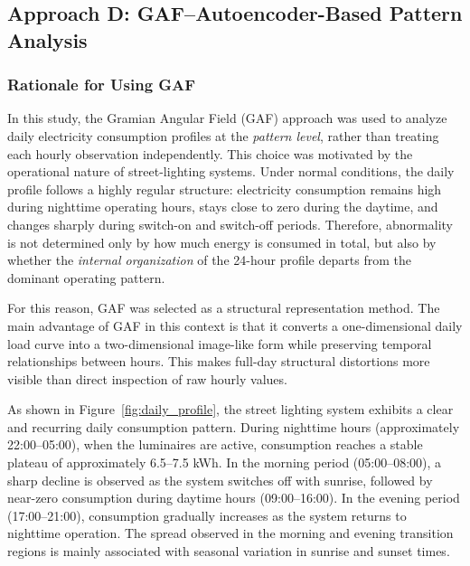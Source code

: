 \documentclass{article}
\begin{document}
\subsection{Approach D: GAF--Autoencoder-Based Pattern Analysis}


\subsubsection{Rationale for Using GAF}

In this study, the Gramian Angular Field (GAF) approach was used to analyze daily electricity consumption profiles at the \emph{pattern level}, rather than treating each hourly observation independently. This choice was motivated by the operational nature of street-lighting systems. Under normal conditions, the daily profile follows a highly regular structure: electricity consumption remains high during nighttime operating hours, stays close to zero during the daytime, and changes sharply during switch-on and switch-off periods. Therefore, abnormality is not determined only by how much energy is consumed in total, but also by whether the \emph{internal organization} of the 24-hour profile departs from the dominant operating pattern.

For this reason, GAF was selected as a structural representation method. The main advantage of GAF in this context is that it converts a one-dimensional daily load curve into a two-dimensional image-like form while preserving temporal relationships between hours. This makes full-day structural distortions more visible than direct inspection of raw hourly values.



As shown in Figure~\ref{fig:daily_profile}, the street lighting system exhibits a clear and recurring daily consumption pattern. During nighttime hours (approximately 22:00--05:00), when the luminaires are active, consumption reaches a stable plateau of approximately 6.5--7.5 kWh. In the morning period (05:00--08:00), a sharp decline is observed as the system switches off with sunrise, followed by near-zero consumption during daytime hours (09:00--16:00). In the evening period (17:00--21:00), consumption gradually increases as the system returns to nighttime operation. The spread observed in the morning and evening transition regions is mainly associated with seasonal variation in sunrise and sunset times.
\end{document}
